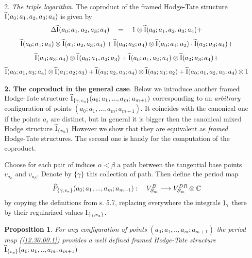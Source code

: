 \documentclass[10pt]{article}
\newtheorem{proposition}[theorem]{Proposition}
\begin{document}
2. {\it The triple logarithm}. The coproduct of the framed Hodge-Tate structure ${\widetilde {\rm I}}(a_0; a_1, a_2, a_3;a_4)$ 
is given by 
$$
\Delta {\widetilde {\rm I}}(a_0; a_1, a_2, a_3; a_4) \quad = \quad 1 
\otimes {\widetilde {\rm I}}(a_0; a_1, a_2, a_3; a_4) +
$$
$$
{\widetilde {\rm I}}(a_0; a_1; a_4) \otimes {\widetilde {\rm I}}(a_1; a_2, a_3; a_4) +  
{\widetilde {\rm I}}(a_0; a_2; a_4) \otimes {\widetilde {\rm I}}(a_0; a_1; a_2) \cdot {\widetilde {\rm I}}(a_2; a_3; a_4) +
$$
$$
{\widetilde {\rm I}}(a_0; a_3; a_4) \otimes {\widetilde {\rm I}}(a_0; a_1, a_2; a_3) +  
{\widetilde {\rm I}}(a_0; a_1, a_2; a_4) \otimes {\widetilde {\rm I}}(a_2; a_3; a_4) +
$$
$$
{\widetilde {\rm I}}(a_0; a_1, a_3; a_4) \otimes {\widetilde {\rm I}}(a_1; a_2; a_3) +
{\widetilde {\rm I}}(a_0; a_2, a_3; a_4) \otimes {\widetilde {\rm I}}(a_0; a_1; a_2) +
{\widetilde {\rm I}}(a_0; a_1, a_2, a_3; a_4) \otimes 1 
$$


{\bf 2. The coproduct in the general case}. Below we introduce another framed Hodge-Tate 
structure 
$\widehat {\rm I}_{\{\gamma, v_a\}}(a_0; a_1, ..., a_m; a_{m+1})$ corresponding to 
an {\it arbitrary} configuration 
of points $(a_0; a_1, ..., a_m; a_{m+1})$. It coincides with the canonical one 
if the points $a_i$ are distinct, but in 
general it is bigger then the  canonical mixed Hodge  structure 
$\widetilde {\rm I}_{\{v_a\}}$
However we show that they are  equivalent as 
{\it framed} Hodge-Tate structures. 
The second one 
is  handy for the computation of the coproduct.

Choose for each pair of indices $\alpha < \beta$ a path between the tangential base points 
$v_{a_{\alpha}}$ and $v_{a_{\beta}}$. Denote by  $\{\gamma\}$ this collection of path. 
Then define the period map  
\begin{equation} \label{12.30.00.1}
\widehat P_{\{\gamma, v_a\}}(a_0; a_1, ..., a_m; a_{m+1}): 
\quad V_{{\cal S}_m}^B \longrightarrow V_{{\cal S}_m}^{DR}\otimes {\mathbb C}
\end{equation} 
by copying 
 the definitions from s. 5.7, replacing everywhere 
the integrals ${\rm I}_{\gamma}$ there by their regularized values
${\rm I}_{\{\gamma, v_a\}}$. 


\begin{proposition} \label{12.30.00.2}
For any 
configuration of points $(a_0; a_1, .., a_m; a_{m+1})$ the period map  (\ref{12.30.00.1}) 
provides a well defined 
framed Hodge-Tate  structure 
$
\widehat {\rm I}_{\{v_a\}}(a_0; a_1, .., a_m; a_{m+1})
$
\end{proposition}
 
\end{document}

